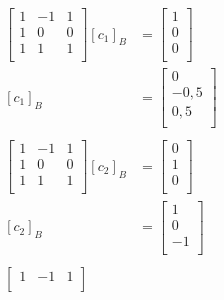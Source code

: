 \documentclass{article}
\begin{document}
\begin{align*}
    \begin{bmatrix}
        1 & -1 & 1 \\
        1 & 0  & 0 \\
        1 & 1  & 1 \\
    \end{bmatrix} [c_1]_B & = \begin{bmatrix}
                                  1 \\
                                  0 \\
                                  0 \\
                              \end{bmatrix} \\
    [c_1]_B               & = \begin{bmatrix}
                                  0    \\
                                  -0,5 \\
                                  0,5  \\
                              \end{bmatrix} \\\\
    \begin{bmatrix}
        1 & -1 & 1 \\
        1 & 0  & 0 \\
        1 & 1  & 1 \\
    \end{bmatrix} [c_2]_B & = \begin{bmatrix}
                                  0 \\
                                  1 \\
                                  0 \\
                              \end{bmatrix} \\
    [c_2]_B               & = \begin{bmatrix}
                                  1  \\
                                  0  \\
                                  -1 \\
                              \end{bmatrix} \\\\
    \begin{bmatrix}
        1 & -1 & 1 \\

\end{bmatrix}
\end{align*}
\end{document}
